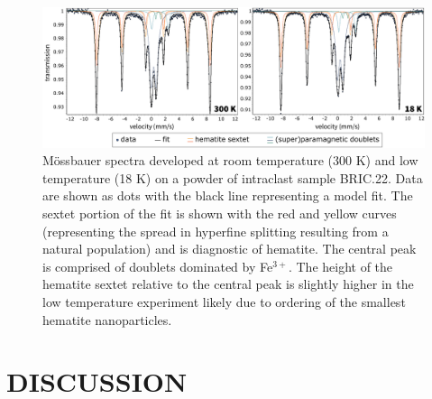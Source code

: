 \documentclass[draft]{agujournal2018}
\begin{document}
\begin{figure}[!ht]
\noindent\includegraphics[width=\textwidth]{figures/mossbauer.pdf}
\caption{\small{M{\"o}ssbauer spectra developed at room temperature (300 K) and low temperature (18 K) on a powder of intraclast sample BRIC.22. Data are shown as dots with the black line representing a model fit. The sextet portion of the fit is shown with the red and yellow curves (representing the spread in hyperfine splitting resulting from a natural population) and is diagnostic of hematite. The central peak is comprised of doublets dominated by Fe$^{3+}$. The height of the hematite sextet relative to the central peak is slightly higher in the low temperature experiment likely due to ordering of the smallest hematite nanoparticles.}}
\label{fig:mossbauer}
\end{figure}

\section*{DISCUSSION}
\end{document}
